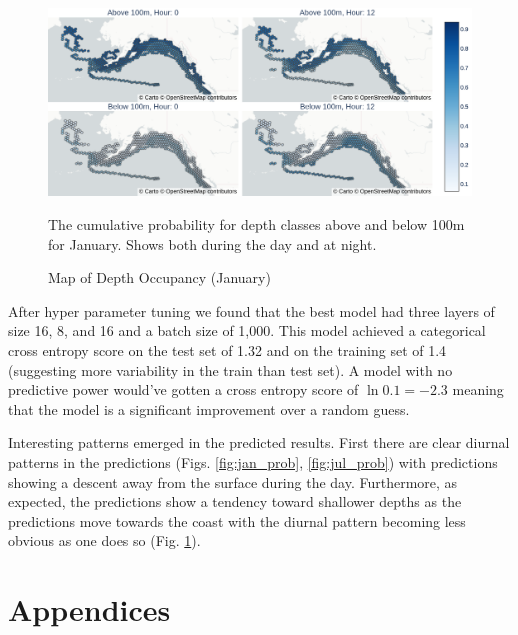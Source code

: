 \documentclass[11pt]{article}
\begin{document}
\begin{figure}[h] 
\begin{center}
  \includegraphics[width=\linewidth]{images/jan_diurnal_map.png}
  
\end{center}
  \caption{Map of Depth Occupancy (January)}
  \medskip
	\small
	The cumulative probability for depth classes above and below 100m for January. Shows both during the day and at night.
  \label{fig:jul_depth_map}
\end{figure}

After hyper parameter tuning we found that the best model had three layers of size 16, 8, and 16 and a batch size of 1,000. This model achieved a categorical cross entropy score on the test set of 1.32 and on the training set of 1.4 (suggesting more variability in the train than test set). A model with no predictive power would've gotten a cross entropy score of $\ln{0.1}=-2.3$ meaning that the model is a significant improvement over a random guess. 

Interesting patterns emerged in the predicted results. First there are clear diurnal patterns in the predictions (Figs. \ref{fig:jan_prob}, \ref{fig:jul_prob}) with predictions showing a descent away from the surface during the day. Furthermore, as expected, the predictions show a tendency toward shallower depths as the predictions move towards the coast with the diurnal pattern becoming less obvious as one does so (Fig. \ref{fig:jul_depth_map}). 






















\newpage
\section{Appendices}
\end{document}

